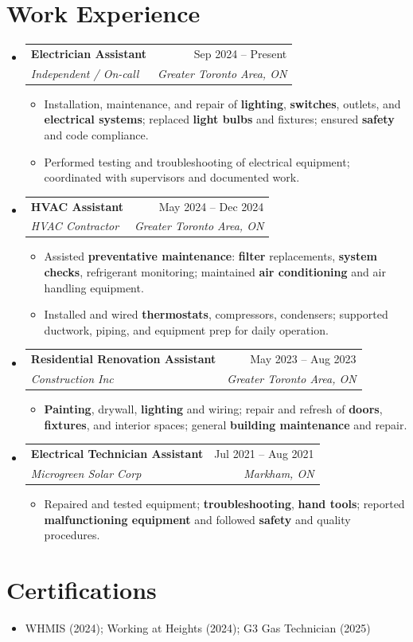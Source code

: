 \documentclass[letterpaper,11pt]{article}
\makeatletter
\newcommand{\resumeItem}[1]{\item\small{{#1 \vspace{-2pt}}}}
\newcommand{\resumeSubheading}[4]{
  \vspace{-2pt}\item
    \begin{tabular*}{0.97\textwidth}[t]{l@{\extracolsep{\fill}}r}
      \textbf{#1} & #2 \\
      \textit{\small #3} & \textit{\small #4} \\
    \end{tabular*}\vspace{-7pt}
}
\newcommand{\resumeSubHeadingListStart}{\begin{itemize}[leftmargin=0.15in, label={}]}
\newcommand{\resumeSubHeadingListEnd}{\end{itemize}}
\newcommand{\resumeItemListStart}{\begin{itemize}}
\newcommand{\resumeItemListEnd}{\end{itemize}\vspace{-5pt}}
\makeatother
\begin{document}
\section{Work Experience}
\resumeSubHeadingListStart

\resumeSubheading
  {Electrician Assistant}{Sep 2024 -- Present}
  {Independent / On-call}{Greater Toronto Area, ON}
\resumeItemListStart
  \resumeItem{Installation, maintenance, and repair of \textbf{lighting}, \textbf{switches}, outlets, and \textbf{electrical systems}; replaced \textbf{light bulbs} and fixtures; ensured \textbf{safety} and code compliance.}
  \resumeItem{Performed testing and troubleshooting of electrical equipment; coordinated with supervisors and documented work.}
\resumeItemListEnd

\resumeSubheading
  {HVAC Assistant}{May 2024 -- Dec 2024}
  {HVAC Contractor}{Greater Toronto Area, ON}
\resumeItemListStart
  \resumeItem{Assisted \textbf{preventative maintenance}: \textbf{filter} replacements, \textbf{system checks}, refrigerant monitoring; maintained \textbf{air conditioning} and air handling equipment.}
  \resumeItem{Installed and wired \textbf{thermostats}, compressors, condensers; supported ductwork, piping, and equipment prep for daily operation.}
\resumeItemListEnd

\resumeSubheading
  {Residential Renovation Assistant}{May 2023 -- Aug 2023}
  {Construction Inc}{Greater Toronto Area, ON}
\resumeItemListStart
  \resumeItem{\textbf{Painting}, drywall, \textbf{lighting} and wiring; repair and refresh of \textbf{doors}, \textbf{fixtures}, and interior spaces; general \textbf{building maintenance} and repair.}
\resumeItemListEnd

\resumeSubheading
  {Electrical Technician Assistant}{Jul 2021 -- Aug 2021}
  {Microgreen Solar Corp}{Markham, ON}
\resumeItemListStart
  \resumeItem{Repaired and tested equipment; \textbf{troubleshooting}, \textbf{hand tools}; reported \textbf{malfunctioning equipment} and followed \textbf{safety} and quality procedures.}
\resumeItemListEnd

\resumeSubHeadingListEnd

\section{Certifications}
\begin{itemize}[leftmargin=0.15in]
  \item WHMIS (2024); Working at Heights (2024); G3 Gas Technician (2025)
\end{itemize}
\end{document}
